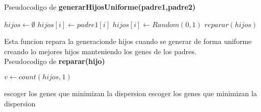 Pseudocodigo de \textbf{generarHijosUniforme(padre1,padre2)}
\begin{algorithm}[H]
  \begin{algorithmic}[1]
      \State $hijos \gets \emptyset$
          \State $hijos[i] \gets padre1[i]$
      \Else
          \State $hijos[i] \gets Random(0,1)$
      \EndIf
      \EndFor
      \State $reparar(hijos)$
      \State {}
    \EndFunction
  \end{algorithmic}
\end{algorithm}

Esta funcion repara la generacionde hijos cuando se generar de forma uniforme creando lo mejores hijos manteniendo 
los genes de los padres.\\

Pseudocodigo de \textbf{reparar(hijo)}
\begin{algorithm}[H]
  \begin{algorithmic}[1]
      \State $v \gets count(hijos,1)$
      
        \State {}
       
          \State escoger los genes que minimizan la dispersion
        \EndWhile
       
          \State escoger los genes que minimizan la dispersion
        \EndWhile
      \EndIf

      \State {}
    \EndFunction
  \end{algorithmic}
\end{algorithm}

